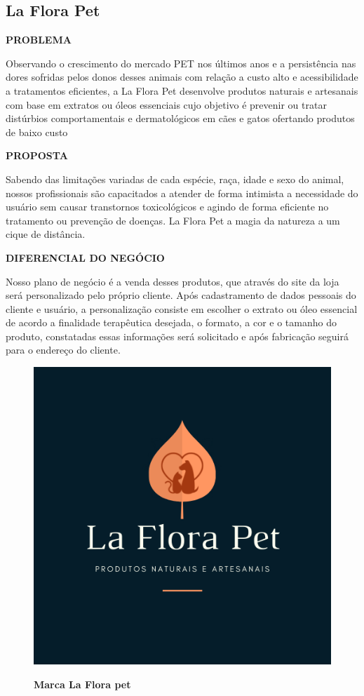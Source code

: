\subsection{La Flora Pet}

\textbf{PROBLEMA}

Observando o crescimento do mercado PET nos últimos anos e a persistência nas dores sofridas pelos donos desses animais com relação a custo alto e acessibilidade a tratamentos eficientes, a La Flora Pet desenvolve produtos naturais e artesanais com base em extratos ou óleos essenciais cujo objetivo é prevenir ou tratar distúrbios comportamentais e dermatológicos em cães e gatos ofertando produtos de baixo custo

\textbf{PROPOSTA}

Sabendo das limitações variadas de cada espécie, raça, idade e sexo do animal, nossos profissionais são capacitados a atender de forma intimista a necessidade do usuário sem causar transtornos toxicológicos e agindo de forma eficiente no tratamento ou prevenção de doenças. La Flora Pet a magia da natureza a um cique de distância.

\textbf{DIFERENCIAL DO NEGÓCIO} 

Nosso plano de negócio é a venda desses produtos, que através do site da loja será personalizado pelo próprio cliente. Após cadastramento de dados pessoais do cliente e usuário, a personalização consiste em escolher o extrato ou óleo essencial de acordo a finalidade terapêutica desejada, o formato, a cor e o tamanho do produto, constatadas essas informações será solicitado e após fabricação seguirá para o endereço do cliente.


\begin{figure}[!htb]
\centering
\caption{\textbf{Marca La Flora pet}}
\includegraphics[scale=4.5]{Imagens/laflorapet.png}
\label{figura_24}
\end{figure}
\newpage




